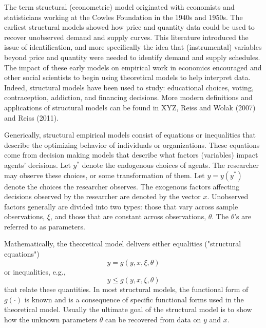 The term structural (econometric) model originated with economists and statisticians working at
the Cowles Foundation in the 1940s and 1950s. The earliest structural models showed how price 
and quantity data could be used to recover unobserved demand and supply curves. This literature
introduced the issue of identification, and more specifically the idea that (instrumental)
variables beyond price and quantity were needed to identify demand and
supply schedules. The impact of these early models on empirical work in economics 
encouraged and other social scientists to begin using theoretical models to help interpret 
data. Indeed, structural models have been used to study: educational choices, voting, 
contraception, addiction, and financing decisions. More modern definitions and applications 
of structural models can be found in XYZ, Reiss and Wolak (2007) and Reiss (2011). 

Generically, structural empirical models consist of equations or inequalities that describe 
the optimizing behavior of individuals or organizations. These equations come from decision making
models that describe what factors (variables) impact agents' decisions. Let $y^*$ denote the endogenous choices 
of agents. The researcher may observe these choices, or some transformation of them.
Let $y=y(y^*)$ denote the choices the researcher observes. The exogenous factors affecting
decisions observed by the researcher are denoted by the vector $x$. Unobserved factors generally
are divided into two types: those that vary across sample observations, $\xi$, and
those that are constant across observations, $\theta$. The $\theta$'s are referred to
as parameters.

Mathematically, the theoretical model delivers either equalities ("structural equations")
$$  y = g(y, x,\xi ,\theta)$$ 
or inequalities, e.g.,
$$  y \le g(y, x,\xi ,\theta)$$
that relate these quantities. In most structural models, the functional form of $g(\cdot)$ is known
and is a consequence of specific functional forms used in the theoretical model. 
Usually the ultimate goal of the structural model is to show how the unknown parameters 
$\theta$ can be recovered from data on $y$ and $x$. 

